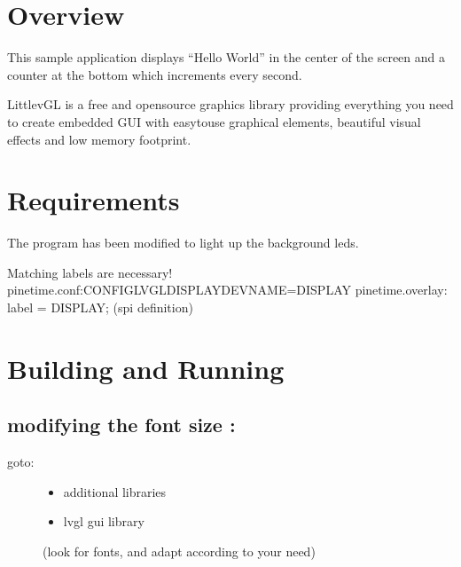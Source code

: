 \documentclass[letterpaper,10pt,english]{sphinxmanual}
\begin{document}
\section{Overview}
\label{\detokenize{lvgl:overview}}
This sample application displays “Hello World” in the center of the screen
and a counter at the bottom which increments every second.

LittlevGL is a free and open\sphinxhyphen{}source graphics library providing everything you need to create embedded GUI with easy\sphinxhyphen{}to\sphinxhyphen{}use graphical elements, beautiful visual effects and low memory footprint.


\section{Requirements}
\label{\detokenize{lvgl:requirements}}
The program has been modified to light up the background leds.


\begin{sphinxVerbatim}[commandchars=\\\{\}]
Matching labels are necessary!
pinetime.conf:CONFIG\PYGZus{}LVGL\PYGZus{}DISPLAY\PYGZus{}DEV\PYGZus{}NAME=\PYGZdq{}DISPLAY\PYGZdq{}
pinetime.overlay:               label = \PYGZdq{}DISPLAY\PYGZdq{}; (spi definition)
\end{sphinxVerbatim}


\section{Building and Running}
\label{\detokenize{lvgl:building-and-running}}
\begin{sphinxVerbatim}[commandchars=\\\{\}]
\end{sphinxVerbatim}


\subsection{modifying the font size :}
\label{\detokenize{lvgl:modifying-the-font-size}}
\begin{sphinxVerbatim}[commandchars=\\\{\}]
\end{sphinxVerbatim}
\begin{description}
\item[{goto:}] \leavevmode\begin{itemize}
\item {} 
additional libraries

\item {} 
lvgl gui library

\end{itemize}

(look for fonts, and adapt according to your need)

\end{description}
\end{document}
